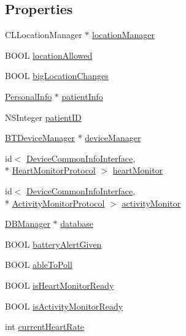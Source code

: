 \subsection*{Properties}
\begin{DoxyCompactItemize}
\item 
C\-L\-Location\-Manager $\ast$ \hyperlink{interface_device_poll_manager_ad710c38392bfc32d3509de470e0cfa8d}{location\-Manager}
\item 
B\-O\-O\-L \hyperlink{interface_device_poll_manager_a0e9aad6cc4f5a99aff27b0a64ae76d19}{location\-Allowed}
\item 
B\-O\-O\-L \hyperlink{interface_device_poll_manager_a8186f40fc585c1bf30ebb8c6e05ca6d4}{big\-Location\-Changes}
\item 
\hyperlink{interface_personal_info}{Personal\-Info} $\ast$ \hyperlink{interface_device_poll_manager_a8739ffcaa2b1e02afc1864e338de148f}{patient\-Info}
\item 
N\-S\-Integer \hyperlink{interface_device_poll_manager_a621e3962372201145248997e2eb87327}{patient\-I\-D}
\item 
\hyperlink{interface_b_t_device_manager}{B\-T\-Device\-Manager} $\ast$ \hyperlink{interface_device_poll_manager_a813e014763804b71e247ca335fe91761}{device\-Manager}
\item 
id$<$ \hyperlink{protocol_device_common_info_interface-p}{Device\-Common\-Info\-Interface}, \\*
\hyperlink{protocol_heart_monitor_protocol-p}{Heart\-Monitor\-Protocol} $>$ \hyperlink{interface_device_poll_manager_a5d06bcab588b72afdf5fce4c102afe91}{heart\-Monitor}
\item 
id$<$ \hyperlink{protocol_device_common_info_interface-p}{Device\-Common\-Info\-Interface}, \\*
\hyperlink{protocol_activity_monitor_protocol-p}{Activity\-Monitor\-Protocol} $>$ \hyperlink{interface_device_poll_manager_a1e33e8f7da83c22dccb6c3b3b7d66069}{activity\-Monitor}
\item 
\hyperlink{interface_d_b_manager}{D\-B\-Manager} $\ast$ \hyperlink{interface_device_poll_manager_a66a02f95a478a42c7e45986317e3c6c1}{database}
\item 
B\-O\-O\-L \hyperlink{interface_device_poll_manager_a8d5b5ff2c336f0dd2cb2b9e088850072}{battery\-Alert\-Given}
\item 
B\-O\-O\-L \hyperlink{interface_device_poll_manager_abe71cba97ae5b0faef77e70b78f2bef2}{able\-To\-Poll}
\item 
B\-O\-O\-L \hyperlink{interface_device_poll_manager_a4735e7c0b634e8693ac8d33a0456d39f}{is\-Heart\-Monitor\-Ready}
\item 
B\-O\-O\-L \hyperlink{interface_device_poll_manager_aeab69bf0530fcf7d3f1b01c785e17bd2}{is\-Activity\-Monitor\-Ready}
\item 
int \hyperlink{interface_device_poll_manager_a302b6434aa606031f78f721c9e40f0cf}{current\-Heart\-Rate}
\end{DoxyCompactItemize}


